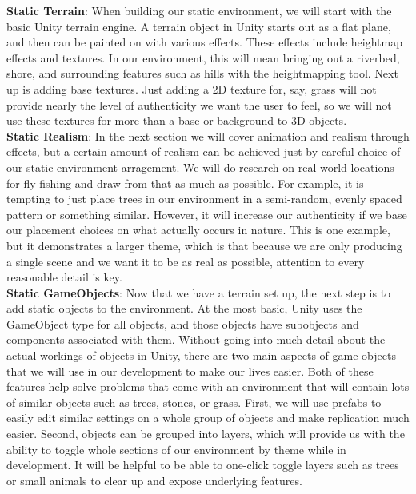 \documentclass[10pt,journal,compsoc,onecolumn, draftclsnofoot]{IEEEtran}
\begin{document}
\hangindent=0.5cm \textbf{Static Terrain}: When building our static environment, we
will start with the basic Unity terrain engine. A terrain object in Unity starts out
as a flat plane, and then can be painted on with various
effects.\cite{unity_man_terrain} These effects include heightmap effects and
textures. In our environment, this will mean bringing out a riverbed, shore, and
surrounding features such as hills with the heightmapping tool. Next up is adding
base textures. Just adding a 2D texture for, say, grass will not provide nearly the
level of authenticity we want the user to feel, so we will not use these textures
for more than a base or background to 3D objects.\\

\hangindent=0.5cm \textbf{Static Realism}: In the next section we will cover
animation and realism through effects, but a certain amount of realism can be
achieved just by careful choice of our static environment arragement. We will do
research on real world locations for fly fishing and draw from that as much as
possible. For example, it is tempting to just place trees in our environment in a
semi-random, evenly spaced pattern or something similar. However, it will increase
our authenticity if we base our placement choices on what actually occurs in nature.
This is one example, but it demonstrates a larger theme, which is that because we
are only producing a single scene and we want it to be as real as possible,
attention to every reasonable detail is key.\\

\hangindent=0.5cm \textbf{Static GameObjects}: Now that we have a terrain set up,
the next step is to add static objects to the environment. At the most basic, Unity
uses the GameObject type for all objects, and those objects have subobjects and
components associated with them. \cite{ray} Without going into much detail about the
actual workings of objects in Unity, there are two main aspects of game objects that
we will use in our development to make our lives easier. Both of these features help
solve problems that come with an environment that will contain lots of similar
objects such as trees, stones, or grass. First, we will use prefabs to easily
edit similar settings on a whole group of objects and make replication much
easier. \cite{ray} Second, objects can be grouped into layers, which will
provide us with the ability to toggle whole sections of our environment by
theme while in development. \cite{layers_video} It will be helpful to be able
to one-click toggle layers such as trees or small animals to clear up and
expose underlying features.\\
\end{document}
